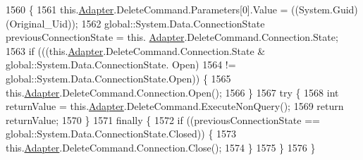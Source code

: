 \begin{DoxyCode}
1560                                                             \{
1561             this.\hyperlink{class_proyecto___integrador__3_1_1ds_usuarios_table_adapters_1_1_usuarios_table_adapter_a46252bad9dadbf20130beca25d50b5bc}{Adapter}.DeleteCommand.Parameters[0].Value = ((System.Guid)(Original\_Uid));
1562             global::System.Data.ConnectionState previousConnectionState = this.
      \hyperlink{class_proyecto___integrador__3_1_1ds_usuarios_table_adapters_1_1_usuarios_table_adapter_a46252bad9dadbf20130beca25d50b5bc}{Adapter}.DeleteCommand.Connection.State;
1563             \textcolor{keywordflow}{if} (((this.\hyperlink{class_proyecto___integrador__3_1_1ds_usuarios_table_adapters_1_1_usuarios_table_adapter_a46252bad9dadbf20130beca25d50b5bc}{Adapter}.DeleteCommand.Connection.State & global::System.Data.ConnectionState.
      Open) 
1564                         != global::System.Data.ConnectionState.Open)) \{
1565                 this.\hyperlink{class_proyecto___integrador__3_1_1ds_usuarios_table_adapters_1_1_usuarios_table_adapter_a46252bad9dadbf20130beca25d50b5bc}{Adapter}.DeleteCommand.Connection.Open();
1566             \}
1567             \textcolor{keywordflow}{try} \{
1568                 \textcolor{keywordtype}{int} returnValue = this.\hyperlink{class_proyecto___integrador__3_1_1ds_usuarios_table_adapters_1_1_usuarios_table_adapter_a46252bad9dadbf20130beca25d50b5bc}{Adapter}.DeleteCommand.ExecuteNonQuery();
1569                 \textcolor{keywordflow}{return} returnValue;
1570             \}
1571             \textcolor{keywordflow}{finally} \{
1572                 \textcolor{keywordflow}{if} ((previousConnectionState == global::System.Data.ConnectionState.Closed)) \{
1573                     this.\hyperlink{class_proyecto___integrador__3_1_1ds_usuarios_table_adapters_1_1_usuarios_table_adapter_a46252bad9dadbf20130beca25d50b5bc}{Adapter}.DeleteCommand.Connection.Close();
1574                 \}
1575             \}
1576         \}
\end{DoxyCode}
